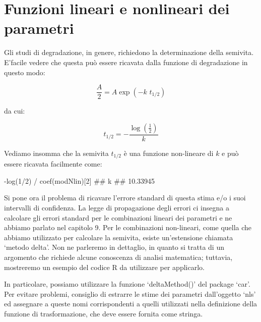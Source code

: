 \documentclass[a4paper,12pt,oneside]{book}
\newenvironment{Shaded}{\begin{snugshade}}{\end{snugshade}}
\newcommand{\DecValTok}[1]{#1}
\newcommand{\SpecialCharTok}[1]{#1}
\newcommand{\DocumentationTok}[1]{#1}
\newcommand{\FunctionTok}[1]{#1}
\newcommand{\NormalTok}[1]{#1}
\begin{document}
\hypertarget{funzioni-lineari-e-nonlineari-dei-parametri}{%
\section{Funzioni lineari e nonlineari dei parametri}\label{funzioni-lineari-e-nonlineari-dei-parametri}}

Gli studi di degradazione, in genere, richiedono la determinazione della semivita. E'facile vedere che questa può essere ricavata dalla funzione di degradazione in questo modo:

\[\frac{A}{2} = A \exp ( - k \,\, t_{1/2})\]

da cui:

\[t_{1/2} = - \frac{ \log \left( {\frac{1}{2}} \right) }{k}\]

Vediamo insomma che la semivita \(t_{1/2}\) è una funzione non-lineare di \(k\) e può essere ricavata facilmente come:

\begin{Shaded}
\begin{Highlighting}[]
\SpecialCharTok{{-}}\FunctionTok{log}\NormalTok{(}\DecValTok{1}\SpecialCharTok{/}\DecValTok{2}\NormalTok{) }\SpecialCharTok{/} \FunctionTok{coef}\NormalTok{(modNlin)[}\DecValTok{2}\NormalTok{]}
\DocumentationTok{\#\#        k }
\DocumentationTok{\#\# 10.33945}
\end{Highlighting}
\end{Shaded}

Si pone ora il problema di ricavare l'errore standard di questa stima e/o i suoi intervalli di confidenza. La legge di propagazione degli errori ci insegna a calcolare gli errori standard per le combinazioni lineari dei parametri e ne abbiamo parlato nel capitolo 9. Per le combinazioni non-lineari, come quella che abbiamo utilizzato per calcolare la semivita, esiste un'estensione chiamata `metodo delta'. Non ne parleremo in dettaglio, in quanto si tratta di un argomento che richiede alcune conoscenza di analisi matematica; tuttavia, mostreremo un esempio del codice R da utilizzare per applicarlo.

In particolare, possiamo utilizzare la funzione `deltaMethod()' del package `car'. Per evitare problemi, consiglio di estrarre le stime dei parametri dall'oggetto `nls' ed assegnare a queste nomi corrispondenti a quelli utilizzati nella definizione della funzione di trasformazione, che deve essere fornita come stringa.
\end{document}
